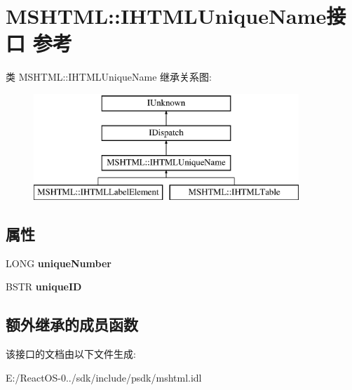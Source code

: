 \hypertarget{interface_m_s_h_t_m_l_1_1_i_h_t_m_l_unique_name}{}\section{M\+S\+H\+T\+ML\+:\+:I\+H\+T\+M\+L\+Unique\+Name接口 参考}
\label{interface_m_s_h_t_m_l_1_1_i_h_t_m_l_unique_name}
类 M\+S\+H\+T\+ML\+:\+:I\+H\+T\+M\+L\+Unique\+Name 继承关系图\+:\begin{figure}[H]
\begin{center}
\leavevmode
\includegraphics[height=4.000000cm]{interface_m_s_h_t_m_l_1_1_i_h_t_m_l_unique_name}
\end{center}
\end{figure}
\subsection*{属性}
\begin{DoxyCompactItemize}
\item 
\mbox{\label{interface_m_s_h_t_m_l_1_1_i_h_t_m_l_unique_name_abc232b53d82bda10af2b21b7d5e01255}} 
L\+O\+NG {\bfseries unique\+Number}
\item 
\mbox{\label{interface_m_s_h_t_m_l_1_1_i_h_t_m_l_unique_name_af61d7c4c0291c5911f784a25b8f2f69b}} 
B\+S\+TR {\bfseries unique\+ID}
\end{DoxyCompactItemize}
\subsection*{额外继承的成员函数}


该接口的文档由以下文件生成\+:\begin{DoxyCompactItemize}
\item 
E\+:/\+React\+O\+S-\/0../sdk/include/psdk/mshtml.\+idl\end{DoxyCompactItemize}
